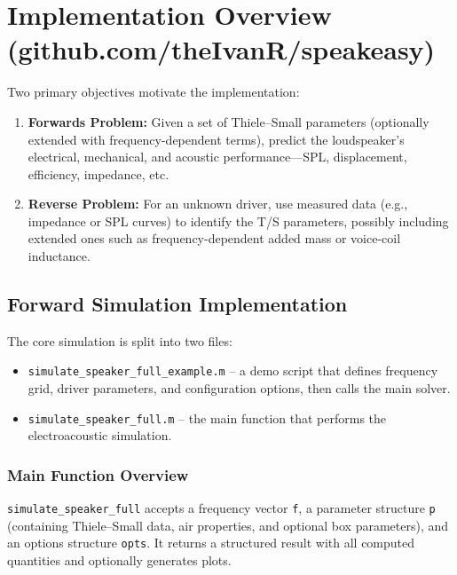 \section{Implementation Overview (github.com/theIvanR/speakeasy)}

Two primary objectives motivate the implementation:

\begin{enumerate}
  \item \textbf{Forwards Problem:} Given a set of Thiele–Small parameters (optionally extended with frequency-dependent terms), predict the loudspeaker’s electrical, mechanical, and acoustic performance—SPL, displacement, efficiency, impedance, etc.
  \item \textbf{Reverse Problem:} For an unknown driver, use measured data (e.g., impedance or SPL curves) to identify the T/S parameters, possibly including extended ones such as frequency-dependent added mass or voice-coil inductance.
\end{enumerate}


\subsection{Forward Simulation Implementation}

The core simulation is split into two files:

\begin{itemize}
  \item \texttt{simulate\_speaker\_full\_example.m} – a demo script that defines frequency grid, driver parameters, and configuration options, then calls the main solver.
  \item \texttt{simulate\_speaker\_full.m} – the main function that performs the electroacoustic simulation.
\end{itemize}

\subsubsection{Main Function Overview}
\texttt{simulate\_speaker\_full} accepts a frequency vector \texttt{f}, a parameter structure \texttt{p} (containing Thiele–Small data, air properties, and optional box parameters), and an options structure \texttt{opts}.  
It returns a structured result with all computed quantities and optionally generates plots.

